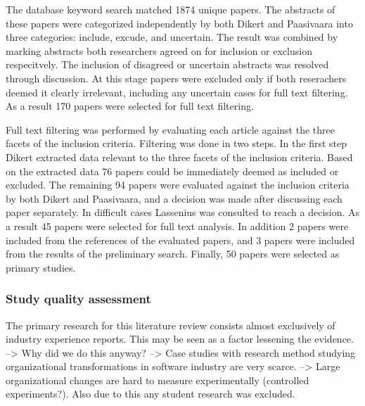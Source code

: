\documentclass[preprint,authoryear,12pt]{elsarticle}
\begin{document}
The database keyword search matched 1874 unique papers. The abstracts of these
papers were categorized independently by both Dikert and Paasivaara into three
categories: include, excude, and uncertain. The result was combined by marking
abstracts both researchers agreed on for inclusion or exclusion respecitvely.
The inclusion of disagreed or uncertain abstracts was resolved through
discussion. At this stage papers were excluded only if both reserachers deemed
it clearly irrelevant, including any uncertain cases for full text filtering. As
a result 170 papers were selected for full text filtering.

%
%
%
%
%
%

Full text filtering was performed by evaluating each article against the three
facets of the inclusion criteria. Filtering was done in two steps. In the first
step Dikert extracted data relevant to the three facets of the inclusion
criteria. Based on the extracted data 76 papers could be immediately deemed as
included or excluded. The remaining 94 papers were evaluated against the
inclusion criteria by both Dikert and Paasivaara, and a decision was made after
discussing each paper separately. In difficult cases Lassenius was consulted to
reach a decision. As a result 45 papers were selected for full text analysis. In
addition 2 papers were included from the references of the evaluated papers, and
3 papers were included from the results of the preliminary search. Finally, 50
papers were selected as primary studies.


\subsubsection{Study quality assessment}

The primary research for this literature review consists almost exclusively of
industry experience reports. This may be seen as a factor lessening the
evidence.
--> Why did we do this anyway?
--> Case studies with research method studying organizational transformations in
    software industry are very scarce.
--> Large organizational changes are hard to measure experimentally (controlled
    experiments?). Also due to this any student research was excluded.
\end{document}

